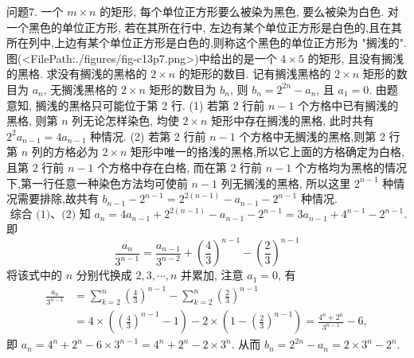 问题7. 一个 $m \times n$ 的矩形, 每个单位正方形要么被染为黑色, 要么被染为白色.
对一个黑色的单位正方形, 若在其所在行中, 左边有某个单位正方形是白色的,且在其所在列中,上边有某个单位正方形是白色的,则称这个黑色的单位正方形为 "搁浅的". 图(<FilePath:./figures/fig-c13p7.png>)中给出的是一个 $4 \times 5$ 的矩形, 且没有搁浅的黑格.
求没有搁浅的黑格的 $2 \times n$ 的矩形的数目.
记有搁浅黑格的 $2 \times n$ 矩形的数目为 $a_n$, 无搁浅黑格的 $2 \times n$ 矩形的数目为 $b_n$, 则 $b_n=2^{2 n}-a_n$, 且 $a_1=0$.
由题意知, 搁浅的黑格只可能位于第 2 行.
(1) 若第 2 行前 $n-1$ 个方格中已有搁浅的黑格, 则第 $n$ 列无论怎样染色, 均使 $2 \times n$ 矩形中存在搁浅的黑格, 此时共有 $2^2 a_{n-1}=4 a_{n-1}$ 种情况.
(2) 若第 2 行前 $n-1$ 个方格中无搁浅的黑格,则第 2 行第 $n$ 列的方格必为 $2 \times n$ 矩形中唯一的挌浅的黑格,所以它上面的方格确定为白格, 且第 2 行前 $n-1$ 个方格中存在白格, 而在第 2 行前 $n-1$ 个方格均为黑格的情况下,第一行任意一种染色方法均可使前 $n-1$ 列无搁浅的黑格, 所以这里 $2^{n-1}$ 种情况需要排除,故共有 $b_{n-1}-2^{n-1}=2^{2(n-1)}-a_{n-1}-2^{n-1}$ 种情况.
$$
\text { 综合 (1)、(2) 知 } a_n=4 a_{n-1}+2^{2(n-1)}-a_{n-1}-2^{n-1}=3 a_{n-1}+4^{n-1}-2^{n-1} \text {. }
$$
即
$$
\frac{a_n}{3^{n-1}}=\frac{a_{n-1}}{3^{n-2}}+\left(\frac{4}{3}\right)^{n-1}-\left(\frac{2}{3}\right)^{n-1}
$$
将该式中的 $n$ 分别代换成 $2,3, \cdots, n$ 并累加, 注意 $a_1=0$, 有
$$
\begin{aligned}
\frac{a_n}{3^{n-1}} & =\sum_{k=2}^n\left(\frac{4}{3}\right)^{n-1}-\sum_{k=2}^n\left(\frac{2}{3}\right)^{n-1} \\
& =4 \times\left(\left(\frac{4}{3}\right)^{n-1}-1\right)-2 \times\left(1-\left(\frac{2}{3}\right)^{n-1}\right)=\frac{4^n+2^n}{3^{n-1}}-6,
\end{aligned}
$$
即 $a_n=4^n+2^n-6 \times 3^{n-1}=4^n+2^n-2 \times 3^n$.
从而 $b_n=2^{2 n}-a_n=2 \times 3^n-2^n$.



